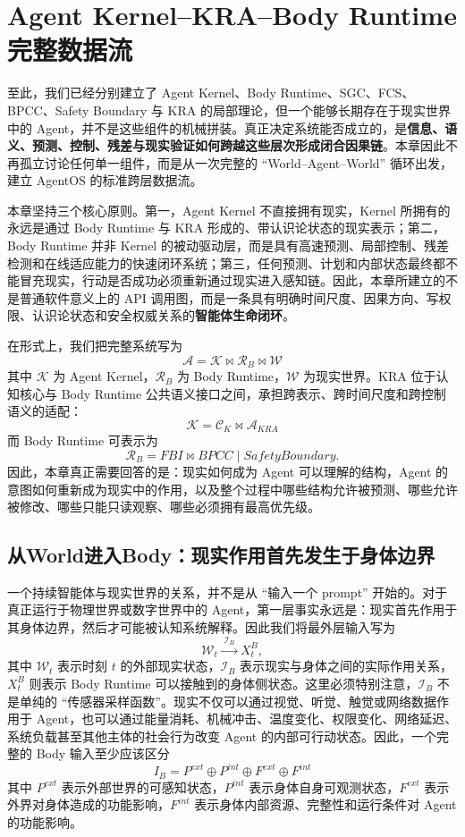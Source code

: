 \chapter{Agent Kernel--KRA--Body Runtime完整数据流}
\label{chap:kernel-kra-bodyruntime-dataflow}

\begin{chapterlead}
至此，我们已经分别建立了 Agent Kernel、Body Runtime、SGC、FCS、BPCC、Safety Boundary 与 KRA 的局部理论，但一个能够长期存在于现实世界中的 Agent，并不是这些组件的机械拼装。真正决定系统能否成立的，是\textbf{信息、语义、预测、控制、残差与现实验证如何跨越这些层次形成闭合因果链}。本章因此不再孤立讨论任何单一组件，而是从一次完整的 ``World--Agent--World'' 循环出发，建立 AgentOS 的标准跨层数据流。

本章坚持三个核心原则。第一，Agent Kernel 不直接拥有现实，Kernel 所拥有的永远是通过 Body Runtime 与 KRA 形成的、带认识论状态的现实表示；第二，Body Runtime 并非 Kernel 的被动驱动层，而是具有高速预测、局部控制、残差检测和在线适应能力的快速闭环系统；第三，任何预测、计划和内部状态最终都不能冒充现实，行动是否成功必须重新通过现实进入感知链。因此，本章所建立的不是普通软件意义上的 API 调用图，而是一条具有明确时间尺度、因果方向、写权限、认识论状态和安全权威关系的\textbf{智能体生命闭环}。

在形式上，我们把完整系统写为
\[
\boxed{
\mathcal A
=
\mathcal K
\bowtie
\mathcal R_B
\bowtie
\mathcal W
}
\]
其中 $\mathcal K$ 为 Agent Kernel，$\mathcal R_B$ 为 Body Runtime，$\mathcal W$ 为现实世界。KRA 位于认知核心与 Body Runtime 公共语义接口之间，承担跨表示、跨时间尺度和跨控制语义的适配：
\[
\boxed{
\mathcal K
=
\mathcal C_K
\bowtie
\mathcal A_{KRA}
}
\]
而 Body Runtime 可表示为
\[
\boxed{
\mathcal R_B
=
FBI
\bowtie
BPCC
\mid
SafetyBoundary .
}
\]
因此，本章真正需要回答的是：现实如何成为 Agent 可以理解的结构，Agent 的意图如何重新成为现实中的作用，以及整个过程中哪些结构允许被预测、哪些允许被修改、哪些只能只读观察、哪些必须拥有最高优先级。
\end{chapterlead}


\section{从World进入Body：现实作用首先发生于身体边界}

一个持续智能体与现实世界的关系，并不是从 ``输入一个 prompt'' 开始的。对于真正运行于物理世界或数字世界中的 Agent，第一层事实永远是：现实首先作用于其身体边界，然后才可能被认知系统解释。因此我们将最外层输入写为
\[
\mathcal W_t
\xrightarrow{\;\mathcal I_B\;}
X^B_t ,
\]
其中 $\mathcal W_t$ 表示时刻 $t$ 的外部现实状态，$\mathcal I_B$ 表示现实与身体之间的实际作用关系，$X^B_t$ 则表示 Body Runtime 可以接触到的身体侧状态。这里必须特别注意，$\mathcal I_B$ 不是单纯的 ``传感器采样函数''。现实不仅可以通过视觉、听觉、触觉或网络数据作用于 Agent，也可以通过能量消耗、机械冲击、温度变化、权限变化、网络延迟、系统负载甚至其他主体的社会行为改变 Agent 的内部可行动状态。因此，一个完整的 Body 输入至少应该区分
\[
\boxed{
I_B
=
P^{ext}
\oplus
P^{int}
\oplus
F^{ext}
\oplus
F^{int}
}
\]
其中 $P^{ext}$ 表示外部世界的可感知状态，$P^{int}$ 表示身体自身可观测状态，$F^{ext}$ 表示外界对身体造成的功能影响，$F^{int}$ 表示身体内部资源、完整性和运行条件对 Agent 的功能影响。

